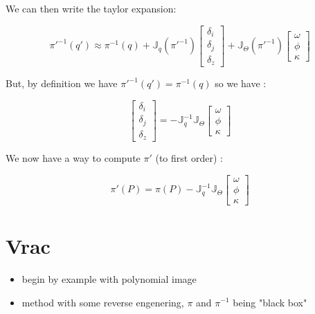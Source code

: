 We can then write the taylor expansion:

\begin{equation}
        \pi'^{-1}(q')
      \approx      \pi^{-1}(q) 
          +   \mathbb{J}_q(\pi'^{-1}) \begin{bmatrix} \delta_i \\ \delta_j \\ \delta_z  \end{bmatrix}
          +   \mathbb{J}_\Theta(\pi'^{-1}) \begin{bmatrix} \omega \\ \phi \\ \kappa  \end{bmatrix}
\end{equation}

But, by definition we have $ \pi'^{-1}(q') =  \pi^{-1}(q) $ so we have :


\begin{equation}
	 \begin{bmatrix} \delta_i \\ \delta_j \\ \delta_z  \end{bmatrix} 
    =  - \mathbb{J}_q ^{-1} \mathbb{J}_\Theta \begin{bmatrix} \omega \\ \phi \\ \kappa  \end{bmatrix}
\end{equation}

We now have a way to compute $\pi'$ (to first order) : 

\begin{equation}
	 \pi'(P) =  \pi(P)  - \mathbb{J}_q ^{-1} \mathbb{J}_\Theta \begin{bmatrix} \omega \\ \phi \\ \kappa  \end{bmatrix}
\end{equation}
\section{Vrac}

\begin{itemize}
    \item begin by example with polynomial image
    \item method with some reverse engenering,  $\pi$ and $\pi^{-1}$ being "black box"
\end{itemize}


